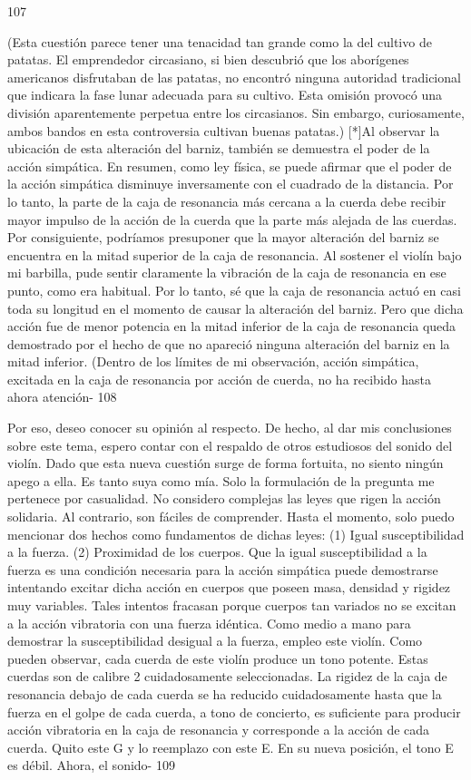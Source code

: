 107

(Esta cuestión parece tener una tenacidad tan grande como la del cultivo de patatas. El emprendedor circasiano, si bien descubrió que los aborígenes americanos disfrutaban de las patatas, no encontró ninguna autoridad tradicional que indicara la fase lunar adecuada para su cultivo. Esta omisión provocó una división aparentemente perpetua entre los circasianos. Sin embargo, curiosamente, ambos bandos en esta controversia cultivan buenas patatas.)
[*]Al observar la ubicación de esta alteración del barniz, también se demuestra el poder de la acción simpática. En resumen, como ley física, se puede afirmar que el poder de la acción simpática disminuye inversamente con el cuadrado de la distancia. Por lo tanto, la parte de la caja de resonancia más cercana a la cuerda debe recibir mayor impulso de la acción de la cuerda que la parte más alejada de las cuerdas. Por consiguiente, podríamos presuponer que la mayor alteración del barniz se encuentra en la mitad superior de la caja de resonancia. Al sostener el violín bajo mi barbilla, pude sentir claramente la vibración de la caja de resonancia en ese punto, como era habitual. Por lo tanto, sé que la caja de resonancia actuó en casi toda su longitud en el momento de causar la alteración del barniz. Pero que dicha acción fue de menor potencia en la mitad inferior de la caja de resonancia queda demostrado por el hecho de que no apareció ninguna alteración del barniz en la mitad inferior.
(Dentro de los límites de mi observación, acción simpática, excitada en la caja de resonancia por
acción de cuerda, no ha recibido hasta ahora atención-
108

Por eso, deseo conocer su opinión al respecto. De hecho, al dar mis conclusiones sobre este tema, espero contar con el respaldo de otros estudiosos del sonido del violín. Dado que esta nueva cuestión surge de forma fortuita, no siento ningún apego a ella. Es tanto suya como mía. Solo la formulación de la pregunta me pertenece por casualidad.
No considero complejas las leyes que rigen la acción solidaria. Al contrario, son fáciles de comprender. Hasta el momento, solo puedo mencionar dos hechos como fundamentos de dichas leyes:
(1) Igual susceptibilidad a la fuerza. (2) Proximidad de los cuerpos.
Que la igual susceptibilidad a la fuerza es una condición necesaria para la acción simpática puede demostrarse intentando excitar dicha acción en cuerpos que poseen masa, densidad y rigidez muy variables. Tales intentos fracasan porque cuerpos tan variados no se excitan a la acción vibratoria con una fuerza idéntica. Como medio a mano para demostrar la susceptibilidad desigual a la fuerza, empleo este violín. Como pueden observar, cada cuerda de este violín produce un tono potente. Estas cuerdas son de calibre 2 cuidadosamente seleccionadas. La rigidez de la caja de resonancia debajo de cada cuerda se ha reducido cuidadosamente hasta que la fuerza en el golpe de cada cuerda, a tono de concierto, es suficiente para producir acción vibratoria en la caja de resonancia y corresponde a la acción de cada cuerda. Quito este G y lo reemplazo con este E. En su nueva posición, el tono E es débil. Ahora, el sonido-
109

